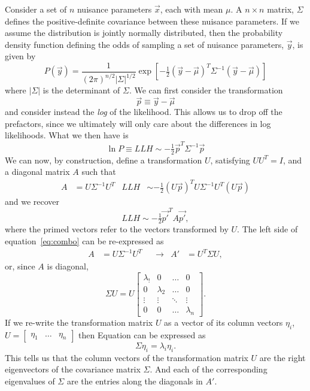 \documentclass[12pt,a4paper]{article}
\newcommand{\abs}[1]{\left| #1 \right|}
\begin{document}
Consider a set of $n$ nuisance parameters $\vec{x}$, each with mean $\mu$.
A $n\times n$ matrix, $\Sigma$ defines the positive-definite covariance between these nuisance parameters. 
If we assume the distribution is jointly normally distributed, then the probability density function defining the odds of sampling a set of nuisance parameters, $\vec{y}$, is given by
\begin{equation}
    P(\vec{y}) = \dfrac{1}{(2\pi)^{n/2}\abs{\Sigma}^{1/2}}\exp\left[-\tfrac{1}{2}(\vec{y}-\vec{\mu})^{T}\Sigma^{-1}\left(\vec{y}-\vec{\mu}\right)\right]
\end{equation}
where $\abs{\Sigma}$ is the determinant of $\Sigma$. We can first consider the transformation 
\begin{equation}
    \vec{p}\equiv \vec{y}-\vec{\mu}
\end{equation}
and consider instead the \textit{log} of the likelihood.
This allows us to drop off the prefactors, since we ultimately will only care about the differences in log likelihoods.
What we then have is 
\begin{equation}
    \ln P \equiv LLH \sim -\tfrac{1}{2}\vec{p}^{T}\Sigma^{-1}\vec{p}
\end{equation}
We can now, by construction, define a transformation $U$, satisfying $UU^{T}=I$, and a diagonal matrix $A$ such that 
\begin{align}\label{eq:combo}
    A&=U\Sigma^{-1}U^{T} & LLH &\sim -\tfrac{1}{2}(U\vec{p})^{T} U\Sigma^{-1}U^{T}(U \vec{p})
\end{align}
and we recover
\begin{equation}
    LLH \sim -\tfrac{1}{2}\vec{p'}^{T} A\vec{p'},
\end{equation}
where the primed vectors refer to the vectors transformed by $U$. The left side of equation~\eqref{eq:combo} can be re-expressed as 
\begin{align}
    A&=U\Sigma^{-1}U^{T} &  &\to & A' &= U^{T}\Sigma U,
\end{align}
or, since $A$ is diagonal,
\begin{equation}\label{eq:mat}
\Sigma U = U\left[ \begin{array}{cccc}\lambda_{!} & 0 & \ldots & 0 \\
0 & \lambda_{2} & \ldots & 0 \\
\vdots & \vdots & \ddots & \vdots \\
0 & 0 & \ldots & \lambda_{n} \end{array}\right].
\end{equation}
If we re-write the transformation matrix $U$ as a vector of its column vectors $\eta_{i}$, $U=\left[\begin{array}{ccc}\eta_{1} & \ldots & \eta_{n} \end{array}\right]$ then Equation can be expressed as 
\begin{equation}
\Sigma \eta_{i} = \lambda_{i}\eta_{i}.
\end{equation}
This tells us that the column vectors of the transformation matrix $U$ are the right eigenvectors of the covariance matrix $\Sigma$. 
And each of the corresponding eigenvalues of $\Sigma$ are the entries along the diagonals in $A'$.
\end{document}
